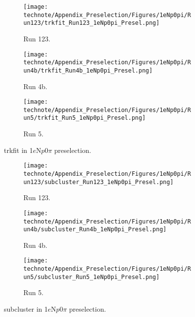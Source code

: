 \begin{figure}[H]
    \centering
    \begin{subfigure}[t]{0.32\linewidth}
        \texttt{[image: technote/Appendix\_Preselection/Figures/1eNp0pi/Run123/trkfit\_Run123\_1eNp0pi\_Presel.png]}
        \caption{Run 123.}
    \end{subfigure}%
    \hspace{0.2cm}%
    \begin{subfigure}[t]{0.32\linewidth}
        \texttt{[image: technote/Appendix\_Preselection/Figures/1eNp0pi/Run4b/trkfit\_Run4b\_1eNp0pi\_Presel.png]}
        \caption{Run 4b.}
    \end{subfigure}%
    \hspace{0.2cm}%
    \begin{subfigure}[t]{0.32\linewidth}
        \texttt{[image: technote/Appendix\_Preselection/Figures/1eNp0pi/Run5/trkfit\_Run5\_1eNp0pi\_Presel.png]}
        \caption{Run 5.}
    \end{subfigure}
    \caption{trkfit in 1$e$N$p$0$\pi$ preselection.}
\end{figure}

\begin{figure}[H]
    \centering
    \begin{subfigure}[t]{0.32\linewidth}
        \texttt{[image: technote/Appendix\_Preselection/Figures/1eNp0pi/Run123/subcluster\_Run123\_1eNp0pi\_Presel.png]}
        \caption{Run 123.}
    \end{subfigure}%
    \hspace{0.2cm}%
    \begin{subfigure}[t]{0.32\linewidth}
        \texttt{[image: technote/Appendix\_Preselection/Figures/1eNp0pi/Run4b/subcluster\_Run4b\_1eNp0pi\_Presel.png]}
        \caption{Run 4b.}
    \end{subfigure}%
    \hspace{0.2cm}%
    \begin{subfigure}[t]{0.32\linewidth}
        \texttt{[image: technote/Appendix\_Preselection/Figures/1eNp0pi/Run5/subcluster\_Run5\_1eNp0pi\_Presel.png]}
        \caption{Run 5.}
    \end{subfigure}
    \caption{subcluster in 1$e$N$p$0$\pi$ preselection.}
\end{figure}

